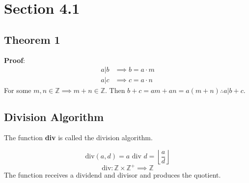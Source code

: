 \documentclass{article}
\begin{document}
\newcommand{\hr}{\par\noindent\rule{\textwidth}{0.4pt}}

\newcommand{\bc}[1]{
	\begin{equation*}
		\begin{boxed}
			{#1}
		\end{boxed}
	\end{equation*}
}

\newcommand{\cond}[2]{
	\ifmmode
	{#1} \quad {#2}
	\else
	$$ {#1} \quad {#2} $$
	\fi
}

\newcommand{\matr}[1]{
	\ifmmode \bm{#1}
	\else \textit{\textbf{#1}}
	\fi
}
\newcommand{\vect}[1]{
	\ifmmode \mathbf{#1}
	\else \textbf{#1}
	\fi
}


\tableofcontents

\section{Section 4.1}

\subsection{Theorem 1}

\textbf{Proof}:
\begin{align*}
	a \vert b & \implies b = a \cdot m \\
	a \vert c & \implies c = a \cdot n
\end{align*}
For some $ m, n \in \mathbb{Z} \implies m + n \in \mathbb{Z} $. Then $ b + c = am + an = a(m + n) \therefore a \vert b + c $.

\subsection{Division Algorithm}

The function \textbf{div} is called the division algorithm.

\begin{equation}
	\text{div}(a, d) = a \text{ div } d = \left\lfloor \frac{ a }{ d } \right\rfloor
\end{equation}
\begin{equation}
	\text{div}: \mathbb{Z} \times \mathbb{Z}^{+} \implies \mathbb{Z}
\end{equation}
The function receives a dividend and divisor and produces the quotient.
\end{document}
